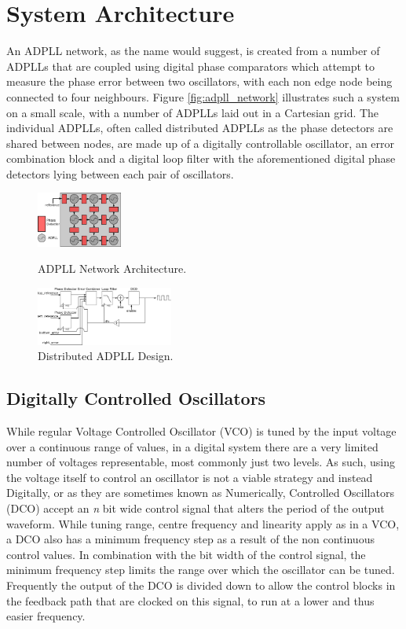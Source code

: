 \documentclass[conference]{IEEEtran}
\begin{document}
\section{System Architecture}
An ADPLL network, as the name would suggest, is created from a number of ADPLLs that are coupled using digital phase comparators which attempt to measure the phase error between two oscillators, with each non edge node being connected to four neighbours. Figure \ref{fig:adpll_network} illustrates such a system on a small scale, with a number of ADPLLs laid out in a Cartesian grid. The individual ADPLLs, often called distributed ADPLLs as the phase detectors are shared between nodes, are made up of a digitally controllable oscillator, an error combination block and a digital loop filter with the aforementioned digital phase detectors lying between each pair of oscillators.
\begin{figure}[h]
    \centering
    \includegraphics[width=0.25\textwidth]{adpll_network}
    \caption{ADPLL Network Architecture.}
    \label{fig:adpll_network}
    \vspace{0.5cm}
    \includegraphics[width=0.4\textwidth]{dist_adpll}
    \caption{Distributed ADPLL Design.}
    \label{fig:adpll_base}
    \vspace{-0.5cm}
\end{figure}
\subsection{Digitally Controlled Oscillators}
While regular Voltage Controlled Oscillator (VCO) is tuned by the input voltage over a continuous range of values, in a digital system there are a very limited number of voltages representable, most commonly just two levels. As such, using the voltage itself to control an oscillator is not a viable strategy and instead Digitally, or as they are sometimes known as Numerically, Controlled Oscillators (DCO) accept an \textit{n} bit wide control signal that alters the period of the output waveform. While tuning range, centre frequency and linearity apply as in a VCO, a DCO also has a minimum frequency step as a result of the non continuous control values. %
In combination with the bit width of the control signal, the minimum frequency step limits the range over which the oscillator can be tuned. Frequently the output of the DCO is divided down to allow the control blocks in the feedback path that are clocked on this signal, to run at a lower and thus easier frequency.
\end{document}
